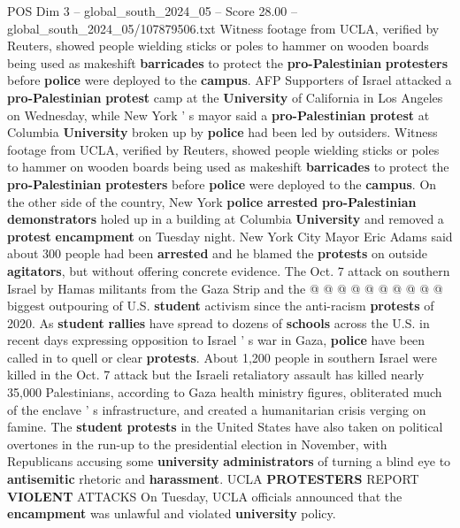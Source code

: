\begin{textsample}{POS Dim 3 – global\_south\_2024\_05 – Score 28.00 – global\_south\_2024\_05/107879506.txt}  \label{ex:f3_pos_094}
Witness footage from UCLA, verified by Reuters, showed people wielding sticks or poles to hammer on wooden boards being used as makeshift \textbf{barricades} to protect the \textbf{pro-Palestinian} \textbf{protesters} before \textbf{police} were deployed to the \textbf{campus}.
AFP Supporters of Israel attacked a \textbf{pro-Palestinian} \textbf{protest} camp at the \textbf{University} of California in Los Angeles on Wednesday, while New York ' s mayor said a \textbf{pro-Palestinian} \textbf{protest} at Columbia \textbf{University} broken up by \textbf{police} had been led by outsiders.
Witness footage from UCLA, verified by Reuters, showed people wielding sticks or poles to hammer on wooden boards being used as makeshift \textbf{barricades} to protect the \textbf{pro-Palestinian} \textbf{protesters} before \textbf{police} were deployed to the \textbf{campus}.
On the other side of the country, New York \textbf{police} \textbf{arrested} \textbf{pro-Palestinian} \textbf{demonstrators} holed up in a building at Columbia \textbf{University} and removed a \textbf{protest} \textbf{encampment} on Tuesday night.
New York City Mayor Eric Adams said about 300 people had been \textbf{arrested} and he blamed the \textbf{protests} on outside \textbf{agitators}, but without offering concrete evidence.
The Oct. 7 attack on southern Israel by Hamas militants from the Gaza Strip and the @ @ @ @ @ @ @ @ @ @ biggest outpouring of U.S. \textbf{student} activism since the anti-racism \textbf{protests} of 2020.
As \textbf{student} \textbf{rallies} have spread to dozens of \textbf{schools} across the U.S. in recent days expressing opposition to Israel ' s war in Gaza, \textbf{police} have been called in to quell or clear \textbf{protests}.
About 1,200 people in southern Israel were killed in the Oct. 7 attack but the Israeli retaliatory assault has killed nearly 35,000 Palestinians, according to Gaza health ministry figures, obliterated much of the enclave ' s infrastructure, and created a humanitarian crisis verging on famine.
The \textbf{student} \textbf{protests} in the United States have also taken on political overtones in the run-up to the presidential election in November, with Republicans accusing some \textbf{university} \textbf{administrators} of turning a blind eye to \textbf{antisemitic} rhetoric and \textbf{harassment}.
UCLA \textbf{PROTESTERS} REPORT \textbf{VIOLENT} ATTACKS On Tuesday, UCLA officials announced that the \textbf{encampment} was unlawful and violated \textbf{university} policy.

\end{textsample}
